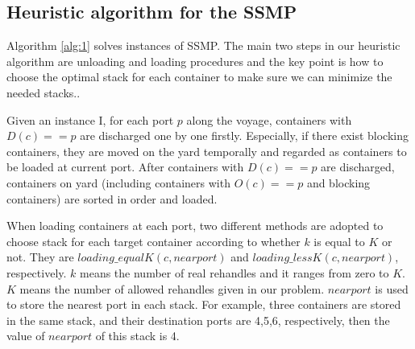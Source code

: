 \documentclass[review,3p,times,authoryear,12pt]{elsarticle}
\begin{document}


\subsection{Heuristic algorithm for the SSMP}
\label{sec:h1}
Algorithm \ref{alg:1} solves instances of SSMP.
The main two steps in our heuristic algorithm are unloading and loading procedures and the key point is how to choose the optimal stack for each container to make sure we can minimize the needed stacks..

Given an instance I, for each port $p$ along the voyage, containers with $D(c)==p$ are discharged one by one firstly.
Especially, if there exist blocking containers, they are moved on the yard temporally and regarded as containers to be loaded at current port.
After containers with $D(c)==p$ are discharged, containers on yard (including containers with $O(c)==p$ and blocking containers) are sorted in order and loaded.


When loading containers at each port, two different methods are adopted to choose stack for each target container according to whether $k$ is equal to $K$ or not.
They are $loading\_equalK(c,nearport)$ and $loading\_lessK(c,nearport)$, respectively.
$k$ means the number of real rehandles and it ranges from zero to $K$.
$K$ means the number of allowed rehandles given in our problem.
$nearport$ is used to store the nearest port in each stack.
For example, three containers are stored in the same stack, and their destination ports are 4,5,6, respectively, then the value of $nearport$ of this stack is 4.
\end{document}
